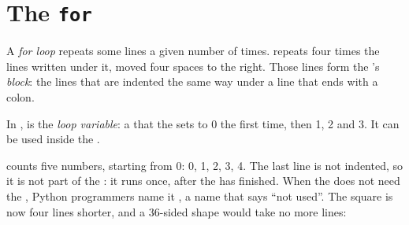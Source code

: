 \section{The \texorpdfstring{\texttt{for}}{for} }

\begin{definition}\label{def:g6:for-loops-turtle:for-loop}
A \emph{for loop} repeats some lines a given number of times.
 repeats four times the lines written under it, moved
four spaces to the right. Those lines form the 's \emph{block}:
the lines that are indented the same way under a line that ends with a colon.
\end{definition}

\begin{definition}\label{def:g6:for-loops-turtle:loop-variable}
In ,  is the \emph{loop
variable}: a  that the  sets to 0 the first
time, then 1, 2 and 3. It can be used inside the .
\end{definition}

\label{lst:g6:for-loops-turtle:count}

\label{out:g6:for-loops-turtle:count}

 counts five numbers, starting from 0: 0, 1, 2, 3, 4. The last
line is not indented, so it is not part of the : it runs once, after the
 has finished. When the  does not need the , Python
programmers name it \code{_}, a name that says ``not used''. The square is now
four lines shorter, and a 36-sided shape would take no more lines:

